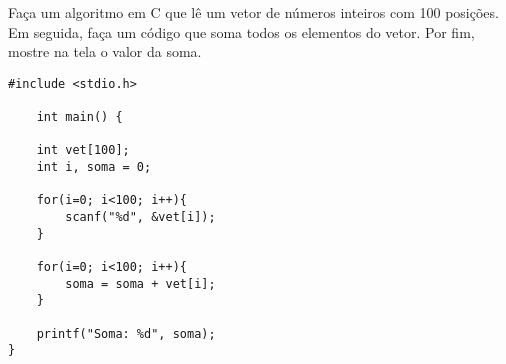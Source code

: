 
\question[10]

Faça um algoritmo em C que lê um vetor de números inteiros com 100 posições. Em seguida, faça um código que soma todos os elementos do vetor. Por fim, mostre na tela o valor da soma.

\begin{solution}
\begin{lstlisting}
#include <stdio.h>

	int main() {
	
	int vet[100];
	int i, soma = 0;
	
	for(i=0; i<100; i++){
		scanf("%d", &vet[i]);
	}
	
	for(i=0; i<100; i++){
		soma = soma + vet[i];
	}
	
	printf("Soma: %d", soma);
}
\end{lstlisting}
\end{solution}